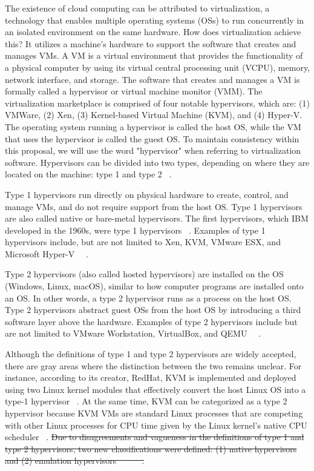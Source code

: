 \documentclass[12pt]{report}
\providecommand{\DIFdeltex}[1]{{\protect\color{red}\sout{#1}}}                      %
\providecommand{\DIFdelbegin}{} %
\providecommand{\DIFdel}[1]{\texorpdfstring{\DIFdeltex{#1}}{}} %
\newcommand{\DIFscaledelfig}{0.5}
\newlength{\DIFdelgraphicswidth} %
\newlength{\DIFdelgraphicsheight} %
\newcommand{\DIFdelincludegraphics}[2][]{%
\sbox{\DIFdelgraphicsbox}{\DIFOincludegraphics[#1]{#2}}%
\settoboxwidth{\DIFdelgraphicswidth}{\DIFdelgraphicsbox} %
\settoboxtotalheight{\DIFdelgraphicsheight}{\DIFdelgraphicsbox} %
\scalebox{\DIFscaledelfig}{%
\parbox[b]{\DIFdelgraphicswidth}{\usebox{\DIFdelgraphicsbox}\\[-\baselineskip] \rule{\DIFdelgraphicswidth}{0em}}\llap{\resizebox{\DIFdelgraphicswidth}{\DIFdelgraphicsheight}{%
\setlength{\unitlength}{\DIFdelgraphicswidth}%
\begin{picture}(1,1)%
\thicklines\linethickness{2pt} %
{\color[rgb]{1,0,0}\put(0,0){\framebox(1,1){}}}%
{\color[rgb]{1,0,0}\put(0,0){\line( 1,1){1}}}%
{\color[rgb]{1,0,0}\put(0,1){\line(1,-1){1}}}%
\end{picture}%
}\hspace*{3pt}}} %
} %
\DeclareRobustCommand{\DIFdelbegin}{\DIFOdelbegin \let\includegraphics\DIFdelincludegraphics} %
\begin{document}
\begin{doublespace}
The existence of cloud computing can be attributed to virtualization, a technology that enables multiple operating systems (OSs) to run concurrently in an isolated environment on the same hardware. How does virtualization achieve this? It utilizes a machine's hardware to support the software that creates and manages VMs. A VM is a virtual environment that provides the functionality of a physical computer by using its virtual central processing unit (VCPU), memory, network interface, and storage. The software that creates and manages a VM is formally called a hypervisor or virtual machine monitor (VMM). The virtualization marketplace is comprised of four notable hypervisors, which are: (1) VMWare, (2) Xen, (3) Kernel-based Virtual Machine (KVM), and (4) Hyper-V. The operating system running a hypervisor is called the host OS, while the VM that uses the hypervisor is called the guest OS. To maintain consistency within this proposal, we will use the word "hypervisor" when referring to virtualization software. Hypervisors can be divided into two types, depending on where they are located on the machine: type 1 and type 2 ~\cite{patel2025hypervisor}.

Type 1 hypervisors run directly on physical hardware to create, control, and manage VMs, and do not require support from the host OS. Type 1 hypervisors are also called native or bare-metal hypervisors. The first hypervisors, which IBM developed in the 1960s, were type 1 hypervisors ~\cite{meier2008ibm}. Examples of type 1 hypervisors include, but are not limited to Xen, KVM, VMware ESX, and Microsoft Hyper-V ~\cite{bauman2015survey}~\cite{patel2025hypervisor}.

Type 2 hypervisors (also called hosted hypervisors) are installed on the OS (Windows, Linux, macOS), similar to how computer programs are installed onto an OS. In other words, a type 2 hypervisor runs as a process on the host OS. Type 2 hypervisors abstract guest OSs from the host OS by introducing a third software layer above the hardware. Examples of type 2 hypervisors include but are not limited to VMware Workstation, VirtualBox, and QEMU ~\cite{bauman2015survey}~\cite{patel2025hypervisor}.

Although the definitions of type 1 and type 2 hypervisors are widely accepted, there are gray areas where the distinction between the two remains unclear. For instance, according to its creator, RedHat, KVM is implemented and deployed using two Linux kernel modules that effectively convert the host Linux OS into a type-1 hypervisor ~\cite{graziano2011performance}. At the same time, KVM can be categorized as a type 2 hypervisor because KVM VMs are standard Linux processes that are competing with other Linux processes for CPU time given by the Linux kernel's native CPU scheduler ~\cite{kvmcpuschedule}.
\DIFdelbegin \DIFdel{Due to disagreements and vagueness in the definitions of type 1 and type 2 hypervisors, two new classifications were defined: (1) native hypervisors and (2) emulation hypervisors ~\mbox{%
\cite{10.1145/2775111}}\hskip0pt%
~\mbox{%
\cite{patel2025hypervisor}}\hskip0pt%
.
}%


\end{doublespace}
\end{document}
